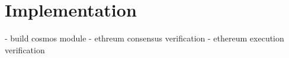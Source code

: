 \section{Implementation}
- build cosmos module
    - ethreum consensus verification
    - ethereum execution verification
